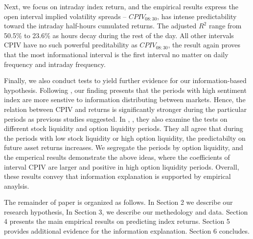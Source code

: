 Next, we focus on intraday index return, and the empirical results express the open interval implied volatility spreads -- $CPIV_{08:30}$, has intense predictability toward the intraday half-hours cumulated returns. The adjusted $R^{2}$ range from 50.5\% to 23.6\% as hours decay during the rest of the day. All other intervals CPIV have no such powerful preditability as $CPIV_{08:30}$, the result again proves that the most informational interval is the first interval no matter on daily frequency and intraday frequency.    

Finally, we also conduct tests to yield further evidence for our information-based hypothesis. Following \textcite{atilgan2015implied}, our finding presents that the periods with high sentiment index are more senstive to information distributing between markets. Hence, the relation between CPIV and returns is significantly stronger during the particular periods as previous studies suggested. In \textcite{pan2006information}, \textcite{chang2018implied}, they also examine the tests on different stock liquidity and option liquidity periods. They all agree that during the periods with low stock liquidity or high option liquidity, the predictabilty on future asset returns increases. We segregate the periods by option liquidity, and the emperical results demonstrate the above ideas, where the coefficients of interval CPIV are larger and positive in high option liquidity periods. Overall, these results convey that information explanation is supported by empirical anaylsis. 

The remainder of paper is organized as follows. In Section 2 we describe our research hypothesis, In Section 3, we describe our methedology and data. Section 4 presents the main empirical results on predicting index returns. Section 5 provides additional evidence for the information explanation. Section 6 concludes. 